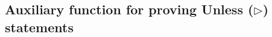 \begin{appendices}
\section{Auxiliary function for proving Unless ($\rhd$) statements}
\label{code:unless-proof}
\begin{code}
    \>[2]\AgdaSpace{}%
    \AgdaSymbol{:}\<%
    \\
    \>[2][@{}l@{\AgdaIndent{0}}]%
    \>[4]\AgdaSymbol{(}\AgdaSpace{}%
    \AgdaSpace{}%
    \AgdaSymbol{(}\AgdaSpace{}%
    \AgdaSpace{}%
    \AgdaSpace{}%
    \AgdaSymbol{))}\AgdaSpace{}%
    \<%
    \\
    \>[4]\AgdaSymbol{(}\AgdaSpace{}%
    \AgdaSpace{}%
    \AgdaSpace{}%
    \AgdaSpace{}%
    \AgdaSpace{}%
    \AgdaSymbol{(}\AgdaSpace{}%
    \AgdaSpace{}%
    \AgdaSpace{}%
    \AgdaSymbol{)}\AgdaSpace{}%
    \AgdaSpace{}%
    \AgdaSymbol{(}\AgdaSpace{}%
    \AgdaSpace{}%
    \AgdaSymbol{))}\AgdaSpace{}%
    \<%
    \\
    \>[4]\AgdaSymbol{((}\AgdaSpace{}%
    \AgdaSymbol{(}\AgdaSpace{}%
    \AgdaOperator{\AgdaInductiveConstructor{,}}\AgdaSpace{}%
    \AgdaSymbol{)}\AgdaSpace{}%
    \AgdaSpace{}%
    \AgdaSymbol{)}\AgdaSpace{}%
    \AgdaSpace{}%
    \AgdaSymbol{(}\AgdaSpace{}%
    \AgdaSpace{}%
    \AgdaSymbol{))}\<%
    \\
    \>[2]\AgdaSpace{}%
    \AgdaSymbol{\{}\AgdaSpace{}%
    \AgdaSymbol{=}\AgdaSpace{}%
    \AgdaSymbol{\}}\AgdaSpace{}%
    \AgdaSymbol{\{}\AgdaSpace{}%
    \AgdaSymbol{=}\AgdaSpace{}%
    \AgdaSymbol{\}}\AgdaSpace{}%
    \AgdaSpace{}%
    \AgdaSpace{}%
    \AgdaSpace{}%
    \AgdaSymbol{(}\AgdaSpace{}%

\end{code}
\end{appendices}
